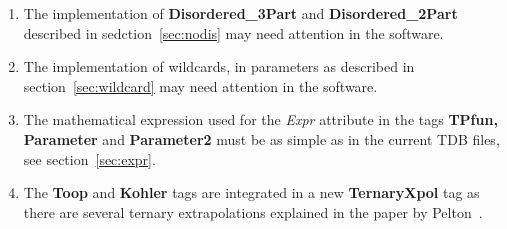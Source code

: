 \documentclass{article}
\begin{document}
\begin{appendices}
\begin{enumerate}
\item The implementation of {\bf Disordered\_3Part} and {\bf
  Disordered\_2Part} described in sedction~\ref{sec:nodis} may need
attention in the software.

\item The implementation of wildcards, in parameters as described in
section~\ref{sec:wildcard} may need attention in the software.

\item The mathematical expression used for the {\em Expr} attribute in the
tags {\bf TPfun, Parameter} and {\bf Parameter2} must be as simple
as in the current TDB files, see section~\ref{sec:expr}.

\item The {\bf Toop} and {\bf Kohler} tags are integrated in a new
  {\bf TernaryXpol} tag as there are several ternary extrapolations
  explained in the paper by Pelton~\cite{01Pel}.
\end{enumerate}

\end{appendices}
\end{document}
